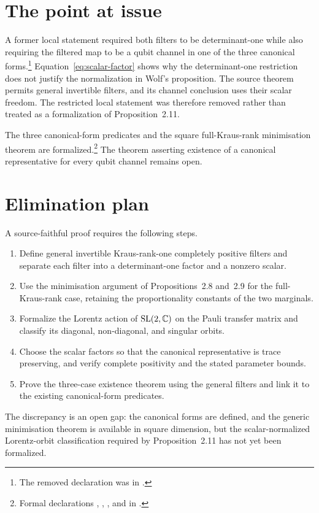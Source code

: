 \documentclass{article}
\begin{document}
\section{The point at issue}

A former local statement required both filters to be determinant-one while also
requiring the filtered map to be a qubit channel in one of the three canonical
forms.\footnote{The removed declaration was
 in
.}  Equation~\eqref{eq:scalar-factor}
shows why the determinant-one restriction does not justify the normalization in
Wolf's proposition. The source theorem permits general invertible filters, and
its channel conclusion uses their scalar freedom. The restricted local
statement was therefore removed rather than treated as a formalization of
Proposition~2.11.

The three canonical-form predicates and the square full-Kraus-rank minimisation
theorem are formalized.\footnote{Formal declarations
, ,
, and
 in
.}  The theorem asserting existence of
a canonical representative for every qubit channel remains open.

\section{Elimination plan}

A source-faithful proof requires the following steps.
\begin{enumerate}
  \item Define general invertible Kraus-rank-one completely positive filters and
    separate each filter into a determinant-one factor and a nonzero scalar.
  \item Use the minimisation argument of Propositions~2.8 and~2.9 for the
    full-Kraus-rank case, retaining the proportionality constants of the two
    marginals.
  \item Formalize the Lorentz action of $\mathrm{SL}(2,\mathbb{C})$ on the Pauli
    transfer matrix and classify its diagonal, non-diagonal, and singular orbits.
  \item Choose the scalar factors so that the canonical representative is trace
    preserving, and verify complete positivity and the stated parameter bounds.
  \item Prove the three-case existence theorem using the general filters and link
    it to the existing canonical-form predicates.
\end{enumerate}

The discrepancy is an open gap: the canonical forms are defined, and the generic
minimisation theorem is available in square dimension, but the scalar-normalized
Lorentz-orbit classification required by Proposition~2.11 has not yet been
formalized.



\end{document}
